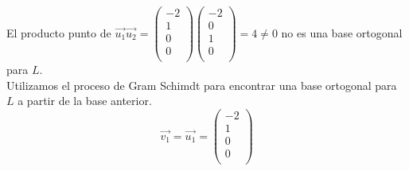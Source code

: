 \documentclass[12pt,a4paper]{report}
\begin{document}
\begin{enumerate}
\begin{enumerate}
El producto punto de $\vec{u_{1}}\vec{u_{2}}=\begin{pmatrix}
-2\\
1\\
0\\
0\\
\end{pmatrix}
\begin{pmatrix}
-2\\
0\\
1\\
0\\
\end{pmatrix}=4\neq 0$ no es una base ortogonal para $L$.\\

Utilizamos el proceso de Gram Schimdt para encontrar una base ortogonal para $L$ a partir de la base anterior.\\

$$\vec{v_{1}}=\vec{u_{1}}=\begin{pmatrix}
-2\\
1\\
0\\
0\\
\end{pmatrix}$$


\end{enumerate}
\end{enumerate}
\end{document}
